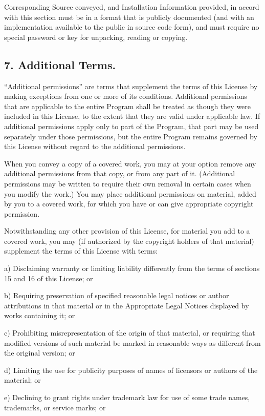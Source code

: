 \documentclass[letterpaper,10pt,english]{sphinxmanual}
\begin{document}
Corresponding Source conveyed, and Installation Information provided,
in accord with this section must be in a format that is publicly
documented (and with an implementation available to the public in
source code form), and must require no special password or key for
unpacking, reading or copying.


\subsection{7. Additional Terms.}
\label{license:additional-terms}
``Additional permissions'' are terms that supplement the terms of this
License by making exceptions from one or more of its conditions.
Additional permissions that are applicable to the entire Program shall
be treated as though they were included in this License, to the extent
that they are valid under applicable law.  If additional permissions
apply only to part of the Program, that part may be used separately
under those permissions, but the entire Program remains governed by
this License without regard to the additional permissions.

When you convey a copy of a covered work, you may at your option
remove any additional permissions from that copy, or from any part of
it.  (Additional permissions may be written to require their own
removal in certain cases when you modify the work.)  You may place
additional permissions on material, added by you to a covered work,
for which you have or can give appropriate copyright permission.

Notwithstanding any other provision of this License, for material you
add to a covered work, you may (if authorized by the copyright holders of
that material) supplement the terms of this License with terms:

a) Disclaiming warranty or limiting liability differently from the
terms of sections 15 and 16 of this License; or

b) Requiring preservation of specified reasonable legal notices or
author attributions in that material or in the Appropriate Legal
Notices displayed by works containing it; or

c) Prohibiting misrepresentation of the origin of that material, or
requiring that modified versions of such material be marked in
reasonable ways as different from the original version; or

d) Limiting the use for publicity purposes of names of licensors or
authors of the material; or

e) Declining to grant rights under trademark law for use of some
trade names, trademarks, or service marks; or
\end{document}
